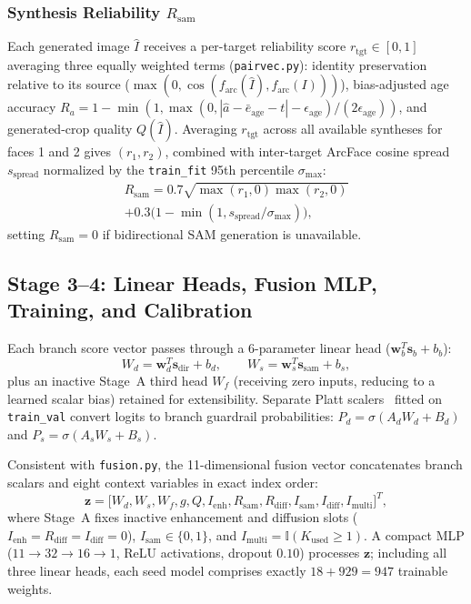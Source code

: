 \documentclass[journal]{IEEEtran}
\newcommand{\vect}[1]{\mathbf{#1}}
\begin{document}
\subsubsection{Synthesis Reliability \texorpdfstring{$R_{\text{sam}}$}{R\_sam}}
Each generated image $\hat{I}$ receives a per-target reliability score $r_{\text{tgt}} \in [0, 1]$ averaging three equally weighted terms (\texttt{pairvec.py}): identity preservation relative to its source ($\max(0, \cos(f_{\text{arc}}(\hat{I}), f_{\text{arc}}(I)))$), bias-adjusted age accuracy $R_a = 1 - \min(1, \max(0, |\hat{a} - \bar{e}_{\text{age}} - t| - \epsilon_{\text{age}}) / (2\epsilon_{\text{age}}))$, and generated-crop quality $Q(\hat{I})$. Averaging $r_{\text{tgt}}$ across all available syntheses for faces 1 and 2 gives $(r_1, r_2)$, combined with inter-target ArcFace cosine spread $s_{\text{spread}}$ normalized by the \texttt{train\_fit} 95th percentile $\sigma_{\max}$:
\begin{multline}
R_{\text{sam}} = 0.7 \sqrt{\max(r_1, 0)\max(r_2, 0)} \\
+ 0.3\big(1 - \min(1, s_{\text{spread}} / \sigma_{\max})\big),
\end{multline}
setting $R_{\text{sam}} = 0$ if bidirectional SAM generation is unavailable.

\subsection{Stage 3--4: Linear Heads, Fusion MLP, Training, and Calibration}
Each branch score vector passes through a 6-parameter linear head ($\vect{w}_b^T \vect{s}_b + b_b$):
\begin{equation}
W_d = \vect{w}_d^T \vect{s}_{\text{dir}} + b_d, \qquad W_s = \vect{w}_s^T \vect{s}_{\text{sam}} + b_s,
\end{equation}
plus an inactive Stage~A third head $W_f$ (receiving zero inputs, reducing to a learned scalar bias) retained for extensibility. Separate Platt scalers~\cite{platt1999} fitted on \texttt{train\_val} convert logits to branch guardrail probabilities: $P_d = \sigma(A_d W_d + B_d)$ and $P_s = \sigma(A_s W_s + B_s)$.

Consistent with \texttt{fusion.py}, the 11-dimensional fusion vector concatenates branch scalars and eight context variables in exact index order:
\begin{equation}
\vect{z} = \big[ W_d, W_s, W_f, g, Q, I_{\text{enh}}, R_{\text{sam}}, R_{\text{diff}}, I_{\text{sam}}, I_{\text{diff}}, I_{\text{multi}} \big]^T,
\end{equation}
where Stage~A fixes inactive enhancement and diffusion slots ($I_{\text{enh}} = R_{\text{diff}} = I_{\text{diff}} = 0$), $I_{\text{sam}} \in \{0, 1\}$, and $I_{\text{multi}} = \mathbb{I}(K_{\text{used}} \ge 1)$. A compact MLP ($11 \!\to\! 32 \!\to\! 16 \!\to\! 1$, ReLU activations, dropout $0.10$) processes $\vect{z}$; including all three linear heads, each seed model comprises exactly $18 + 929 = 947$ trainable weights.
\end{document}
